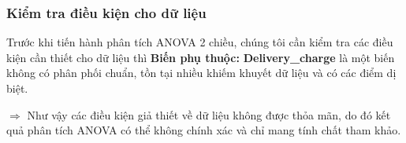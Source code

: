 \subsubsection{Kiểm tra điều kiện cho dữ liệu}
Trước khi tiến hành phân tích ANOVA 2 chiều, chúng tôi cần kiểm tra các điều kiện cần thiết cho dữ liệu thì \textbf{Biến phụ thuộc:} \textbf{Delivery\_charge} là một biến không có phân phối chuẩn, tồn tại nhiều khiếm khuyết dữ liệu và có các điểm dị biệt.

$ \Rightarrow $ Như vậy các điều kiện giả thiết về dữ liệu không được thỏa mãn, do đó kết quả phân tích ANOVA có thể không chính xác và chỉ mang tính chất tham khảo.
